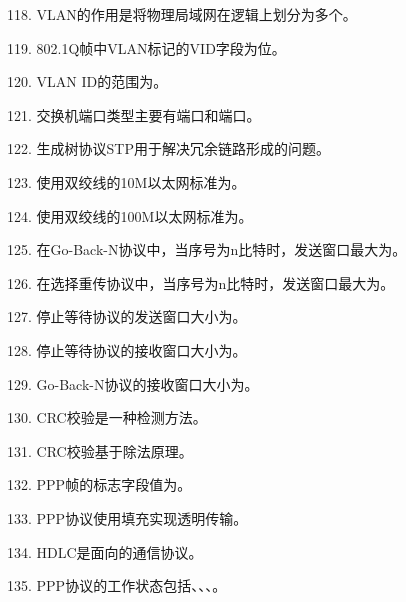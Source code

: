 118. VLAN的作用是将物理局域网在逻辑上划分为多个\underline{\hspace{2cm}}。

119. 802.1Q帧中VLAN标记的VID字段为\underline{\hspace{2cm}}位。

120. VLAN ID的范围为\underline{\hspace{2cm}}。

121. 交换机端口类型主要有\underline{\hspace{2cm}}端口和\underline{\hspace{2cm}}端口。

122. 生成树协议STP用于解决冗余链路形成的\underline{\hspace{2cm}}问题。

123. 使用双绞线的10M以太网标准为\underline{\hspace{2cm}}。

124. 使用双绞线的100M以太网标准为\underline{\hspace{2cm}}。

125. 在Go-Back-N协议中，当序号为n比特时，发送窗口最大为\underline{\hspace{2cm}}。

126. 在选择重传协议中，当序号为n比特时，发送窗口最大为\underline{\hspace{2cm}}。

127. 停止等待协议的发送窗口大小为\underline{\hspace{2cm}}。

128. 停止等待协议的接收窗口大小为\underline{\hspace{2cm}}。

129. Go-Back-N协议的接收窗口大小为\underline{\hspace{2cm}}。

130. CRC校验是一种\underline{\hspace{2cm}}检测方法。

131. CRC校验基于\underline{\hspace{2cm}}除法原理。

132. PPP帧的标志字段值为\underline{\hspace{2cm}}。

133. PPP协议使用\underline{\hspace{2cm}}填充实现透明传输。

134. HDLC是面向\underline{\hspace{2cm}}的通信协议。

135. PPP协议的工作状态包括\underline{\hspace{2cm}}、\underline{\hspace{2cm}}、\underline{\hspace{2cm}}、\underline{\hspace{2cm}}。

